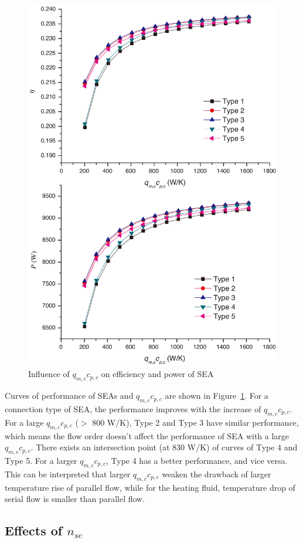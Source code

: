 \noindent \begin{figure}[htbp]
\begin{center}
	\includegraphics[width = 0.7\columnwidth]{./fig/qm_ccp_c}
	\caption{Influence of $q_{m,c}c_{p,c}$ on efficiency and power of SEA}
	\label{fig:qm_ccp_c}
\end{center}
\end{figure}

Curves of performance of SEAs and $q_{m,c}c_{p,c}$ are shown in Figure~\ref{fig:qm_ccp_c}. For a connection type of SEA, the performance improves with the increase of $q_{m,c}c_{p,c}$. For a large $q_{m,c}c_{p,c}$ ($>$ 800 W/K), Type 2 and Type 3 have similar performance, which means the flow order doesn't affect the performance of SEA with a large $q_{m,c}c_{p,c}$. There exists an intersection point (at 830 W/K) of curves of Type 4 and Type 5. For a larger $q_{m,c}c_{p,c}$, Type 4 has a better performance, and vice versa. This can be interpreted that larger $q_{m,c}c_{p,c}$ weaken the drawback of larger temperature rise of parallel flow, while for the heating fluid, temperature drop of serial flow is smaller than parallel flow.

\subsection{Effects of $n_{se}$}

